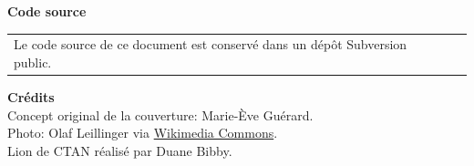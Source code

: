\begin{frame}[t,plain,fragile=singleslide]
  \textbf{Code source} \\
  \begin{tabularx}{0.6\linewidth}{@{}Xl@{}}
    Le code source de ce document est conservé dans un dépôt
    Subversion public. &
                         \raisebox{-3pt}{%
                         \href{https://svn.fsg.ulaval.ca/svn-pub/vgoulet/formation_latex/}{%
                         \browsebutton}}
  \end{tabularx}
  \vspace*{4mm}

  \textbf{Crédits} \\
  Concept original de la couverture: Marie-Ève Guérard. \\
  Photo: Olaf Leillinger via
  \href{https://commons.wikimedia.org/wiki/File:Suricata.suricatta.6861.jpg}{%
    Wikimedia Commons}. \\
  Lion de CTAN réalisé par Duane Bibby.
  \vfill
\end{frame}

